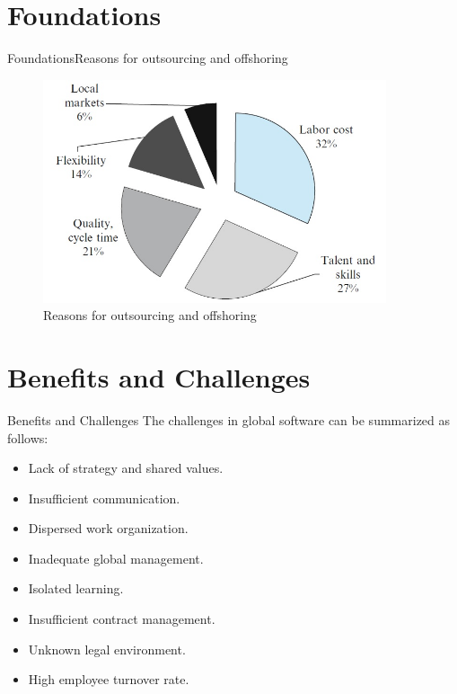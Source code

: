 \documentclass[10pt]{beamer}
\begin{document}
\section{Foundations}
\begin{frame}{Foundations}{Reasons for outsourcing and offshoring}  
	\begin{figure}[H] 
		\begin{flushleft}
			\includegraphics[width=0.90\textwidth]{./AAUgraphics/fundamentos.jpg}
			\caption{Reasons for outsourcing and offshoring}
			\label{DCP}
		\end{flushleft}
	\end{figure}
\end{frame}

\section{Benefits and Challenges}
\begin{frame}{Benefits and Challenges}{}
	The challenges in global software can be summarized as follows:
	\begin{itemize}
		\item<1-> Lack of strategy and shared values.
		\item<1-> Insufficient communication.
		\item<1-> Dispersed work organization.
		\item<1-> Inadequate global management.		
		\item<1-> Isolated learning.
		\item<1-> Insufficient contract management.
		\item<1-> Unknown legal environment.
		\item<1-> High employee turnover rate.
	\end{itemize}
\end{frame}
\end{document}
